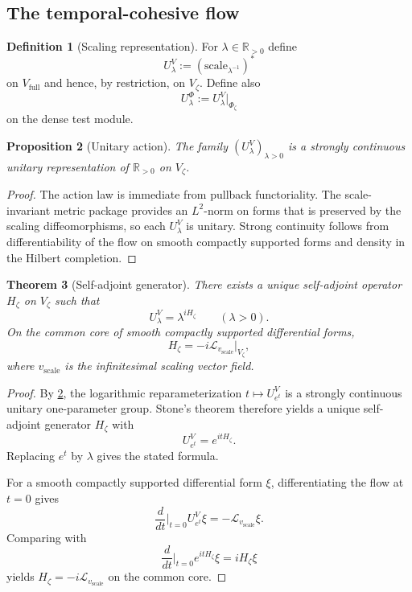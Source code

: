 \documentclass[11pt,a4paper]{article}
\theoremstyle{plain}
\newtheorem{theorem}{Theorem}[section]
\newtheorem{proposition}[theorem]{Proposition}
\theoremstyle{definition}
\newtheorem{definition}[theorem]{Definition}
\newcommand{\R}{\mathbb{R}}
\begin{document}
\subsection{The temporal-cohesive flow}

\begin{definition}[Scaling representation]
For $\lambda\in\R_{>0}$ define
\[
  U^V_{\lambda}:=(\mathrm{scale}_{\lambda^{-1}})^{\ast}
\]
on $V_{\mathrm{full}}$ and hence, by restriction, on $V_{\zeta}$.
Define also
\[
  U^{\Phi}_{\lambda}:=U^V_{\lambda}\big|_{\Phi_{\zeta}}
\]
on the dense test module.
\end{definition}

\begin{proposition}[Unitary action]
\label{prop:unitary}
The family $(U^V_{\lambda})_{\lambda>0}$ is a strongly continuous unitary representation of $\R_{>0}$ on $V_{\zeta}$.
\end{proposition}

\begin{proof}
The action law is immediate from pullback functoriality. The scale-invariant metric package provides an $L^2$-norm on forms that is preserved by the scaling diffeomorphisms, so each $U^V_{\lambda}$ is unitary. Strong continuity follows from differentiability of the flow on smooth compactly supported forms and density in the Hilbert completion.
\end{proof}

\begin{theorem}[Self-adjoint generator]
\label{thm:stone}
There exists a unique self-adjoint operator $H_{\zeta}$ on $V_{\zeta}$ such that
\[
  U^V_{\lambda}=\lambda^{iH_{\zeta}}\qquad(\lambda>0).
\]
On the common core of smooth compactly supported differential forms,
\[
  H_{\zeta} = -i\mathcal L_{v_{\mathrm{scale}}}\big|_{V_{\zeta}},
\]
where $v_{\mathrm{scale}}$ is the infinitesimal scaling vector field.
\end{theorem}

\begin{proof}
By \cref{prop:unitary}, the logarithmic reparameterization $t\mapsto U^V_{e^t}$ is a strongly continuous unitary one-parameter group. Stone's theorem therefore yields a unique self-adjoint generator $H_{\zeta}$ with
\[
  U^V_{e^t}=e^{itH_{\zeta}}.
\]
Replacing $e^t$ by $\lambda$ gives the stated formula.

For a smooth compactly supported differential form $\xi$, differentiating the flow at $t=0$ gives
\[
  \frac{d}{dt}\Big|_{t=0} U^V_{e^t}\xi = -\mathcal L_{v_{\mathrm{scale}}}\xi.
\]
Comparing with
\[
  \frac{d}{dt}\Big|_{t=0} e^{itH_{\zeta}}\xi = iH_{\zeta}\xi
\]
yields $H_{\zeta}=-i\mathcal L_{v_{\mathrm{scale}}}$ on the common core.
\end{proof}
\end{document}
